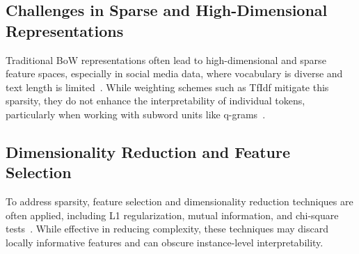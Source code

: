 \documentclass[runningheads,10pt]{llncs}
\begin{document}

\subsection{Challenges in Sparse and High-Dimensional Representations}

Traditional \ac{BoW} representations often lead to high-dimensional and sparse feature spaces, especially in social media data, where vocabulary is diverse and text length is limited~\cite{aminimotlagh2022reliable}. While weighting schemes such as \ac{TfIdf} mitigate this sparsity, they do not enhance the interpretability of individual tokens, particularly when working with subword units like q-grams~\cite{wang2021hierarchical}.

\subsection{Dimensionality Reduction and Feature Selection}

To address sparsity, feature selection and dimensionality reduction techniques are often applied, including L1 regularization, mutual information, and chi-square tests~\cite{heidary2024performance}. While effective in reducing complexity, these techniques may discard locally informative features and can obscure instance-level interpretability.
\end{document}

